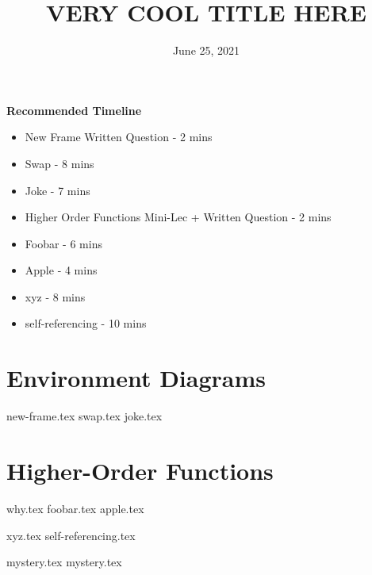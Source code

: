 \documentclass{exam}
\title{VERY COOL TITLE HERE}
\date{June 25, 2021}
\begin{document}
\maketitle


\begin{blocksection}
\begin{guide}
\textbf{Recommended Timeline}
\begin{itemize}
    \item New Frame Written Question - 2 mins
    \item Swap - 8 mins
    \item Joke - 7 mins
    \item Higher Order Functions Mini-Lec + Written Question - 2 mins
    \item Foobar - 6 mins
    \item Apple - 4 mins
    \item xyz - 8 mins
    \item self-referencing - 10 mins
\end{itemize}
\end{guide}
\end{blocksection}


\section{Environment Diagrams}
\begin{questions}
{new-frame.tex}
{swap.tex}
\newpage
{joke.tex}
\end{questions}

\newpage
\section{Higher-Order Functions}
\begin{questions}
{why.tex}
{foobar.tex}
{apple.tex}

\newpage
{xyz.tex}
{self-referencing.tex}

\newpage
{mystery.tex}
{mystery.tex}
\clearpage

\end{questions}
\end{document}
